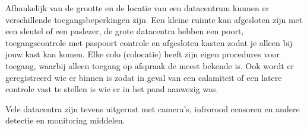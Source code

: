 Afhankelijk van de grootte en de locatie van een datacentrum kunnen er verschillende toegangsbeperkingen zijn. Een kleine ruimte kan afgesloten zijn met een sleutel of een paslezer, de grote datacentra hebben een poort, toegangscontrole met paspoort controle en afgesloten kasten zodat je alleen bij jouw kast kan komen. Elke colo (colocatie) heeft zijn eigen procedures voor toegang, waarbij alleen toegang op afspraak de meest bekende is. Ook wordt er geregistreerd wie er binnen is zodat in geval van een calamiteit of een latere controle vast te stellen is wie er in het pand aanwezig was.

Vele datacentra zijn tevens uitgerust met camera's, infrorood censoren en andere detectie en monitoring middelen.
